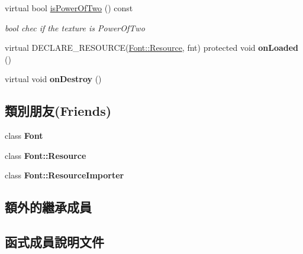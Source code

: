 \begin{DoxyCompactItemize}
virtual bool \hyperlink{class_magnum_1_1_font_1_1_resource_aa85f09b7439ed4282cc04260f5fa25cd}{is\+Power\+Of\+Two} () const 
\begin{DoxyCompactList}\small\item\em bool chec if the texture is Power\+Of\+Two \end{DoxyCompactList}\item 
virtual D\+E\+C\+L\+A\+R\+E\+\_\+\+R\+E\+S\+O\+U\+R\+CE(\hyperlink{class_magnum_1_1_font_1_1_resource}{Font\+::\+Resource}, fnt) protected void {\bfseries on\+Loaded} ()\hypertarget{class_magnum_1_1_font_1_1_resource_a247b305c5e2cd8c6963bbbcb4ae709a0}{}\label{class_magnum_1_1_font_1_1_resource_a247b305c5e2cd8c6963bbbcb4ae709a0}

\item 
virtual void {\bfseries on\+Destroy} ()\hypertarget{class_magnum_1_1_font_1_1_resource_acab56e1548e599298f740b79b7d6a882}{}\label{class_magnum_1_1_font_1_1_resource_acab56e1548e599298f740b79b7d6a882}

\end{DoxyCompactItemize}
\subsection*{類別朋友(Friends)}
\begin{DoxyCompactItemize}
\item 
class {\bfseries Font}\hypertarget{class_magnum_1_1_font_1_1_resource_ad564b94b59dc295de3dfc4415d95cca8}{}\label{class_magnum_1_1_font_1_1_resource_ad564b94b59dc295de3dfc4415d95cca8}

\item 
class {\bfseries Font\+::\+Resource}\hypertarget{class_magnum_1_1_font_1_1_resource_aed1576435da2fd6be67b0972d456c130}{}\label{class_magnum_1_1_font_1_1_resource_aed1576435da2fd6be67b0972d456c130}

\item 
class {\bfseries Font\+::\+Resource\+Importer}\hypertarget{class_magnum_1_1_font_1_1_resource_adcf31f02b1c16e69102f4d80f9a06dfd}{}\label{class_magnum_1_1_font_1_1_resource_adcf31f02b1c16e69102f4d80f9a06dfd}

\end{DoxyCompactItemize}
\subsection*{額外的繼承成員}


\subsection{函式成員說明文件}
